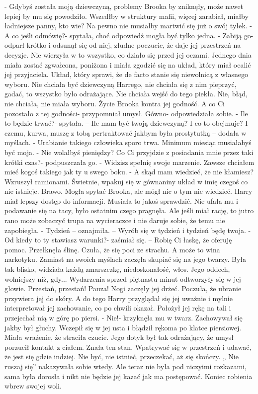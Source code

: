 \documentclass[12pt,a4paper]{book}
\begin{document}
- Gdybyś została moją dziewczyną, problemy Brooka by zniknęły, może nawet lepiej by mu się powodziło. Wszedłby w struktury mafii, więcej zarabiał, miałby ładniejsze panny, kto wie? Na pewno nie musiałby martwić się już o swój tyłek. 
- A co jeśli odmówię?- spytała, choć odpowiedź mogła być tylko jedna. 
- Zabiją go- odparł krótko i odsunął się od niej, złudne poczucie, że daje jej przestrzeń na decyzje.
Nie wierzyła w to wszystko, co działo się przed jej oczami. Jednego dnia miała zostać zgwałcona, poniżona i miała zgodzić się na układ, który miał ocalić jej przyjaciela. Układ, który sprawi, że de facto stanie się niewolnicą z własnego wyboru. Nie chciała być dziewczyną Harrego, nie chciała się z nim pieprzyć, gadać, to wszystko było odrażające. Nie chciała wejść do tego piekła. Nie, błąd, nie chciała, nie miała wyboru. Życie Brooka kontra jej godność. A co Ci pozostało z tej godności- przypomniał umysł. Gówno- odpowiedziała sobie. 
- Ile to będzie trwać?- spytała. – Ile mam być twoją dziewczyną? I co to obejmuje?
I czemu, kurwa, muszę z tobą pertraktować jakbym była prostytutką – dodała w myślach.
- Urabianie takiego człowieka sporo trwa. Minimum miesiąc musiałabyś być moja.
- Nie wolałbyś pieniędzy? Co Ci przyjdzie z posiadania mnie przez taki krótki czas?- podpuszczała go.
- Widzisz spełnię swoje marzenie. Zawsze chciałem mieć kogoś takiego jak ty u swego boku. 
- A skąd mam wiedzieć, że nie kłamiesz? 
Wzruszył ramionami. Świetnie, wpakuj się w gównaniny układ w imię czegoś co nie istnieje. Brawo. Mogła spytać Brooka, ale mógł nic o tym nie wiedzieć. Harry miał lepszy dostęp do informacji. Musiała to jakoś sprawdzić. Nie ufała mu i podawanie się na tacy, było ostatnim czego pragnęła. Ale jeśli miał rację, to jutro rano może zobaczyć trupa na wycieraczce i nie daruje sobie, że temu nie zapobiegła. 
- Tydzień – oznajmiła. – Wyrób się w tydzień i tydzień będę twoja. 
- Od kiedy to ty stawiasz warunki?- zaśmiał się. – Robię Ci łaskę, że oferuję pomoc. 
Przełknęła ślinę. Czuła, że się poci ze strachu. A może to wina narkotyku. Zamiast na swoich myślach zaczęła skupiać się na jego twarzy. Była tak blisko, widziała każdą zmarszczkę, niedoskonałość, włos. Jego oddech, wolniejszy niż, gdy... Wydarzenia sprzed piętnastu minut odtworzyły się w jej głowie. Przestań, przestań! Pauza! Nogi zaczęły jej drżeć. Poczuła, że ubranie przywiera jej do skóry. A do tego Harry przyglądał się jej uważnie i mylnie interpretował jej zachowanie, co po chwili okazał. Położył jej rękę na tali i przejechał nią w górę po piersi. 
- Nie!- krzyknęła mu w twarz. 
Zachowywał się jakby był głuchy. Wczepił się w jej usta i błądził rękoma po klatce piersiowej. Miała wrażenie, że straciła czucie. Jego dotyk był tak odrażający, że umysł porzucił kontakt z ciałem. Znała ten stan. Wpatrywać się w przestrzeń i udawać, że jest się gdzie indziej. Nie być, nie istnieć, przeczekać, aż się skończy. „ Nie ruszaj się” nakazywała sobie wtedy. Ale teraz nie była pod niczyimi rozkazami, sama była dorosła i nikt nie będzie jej kazać jak ma postępować. Koniec robienia wbrew swojej woli. 
\end{document}
